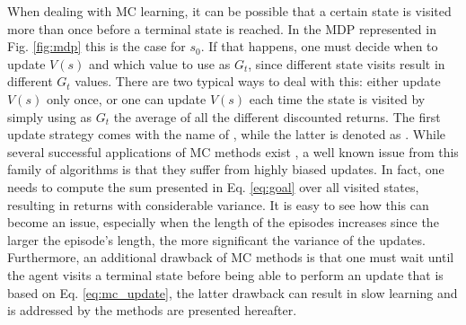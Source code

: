 When dealing with MC learning, it can be possible that a certain state is visited more than once before a terminal state is reached. In the MDP represented in Fig. \ref{fig:mdp} this is the case for $s_0$. If that happens, one must decide when to update $V(s)$ and which value to use as $G_t$, since different state visits result in different $G_t$ values. There are two typical ways to deal with this: either update $V(s)$ only once, or one can update $V(s)$ each time the state is visited by simply using as $G_t$ the average of all the different discounted returns. The first update strategy comes with the name of , while the latter is denoted as .
While several successful applications of MC methods exist \cite{jaakkola1995reinforcement,liu1998sequential,lazaric2007reinforcement}, a well known issue from this family of algorithms is that they suffer from highly biased updates. In fact, one needs to compute the sum presented in Eq. \ref{eq:goal} over all visited states, resulting in returns with considerable variance. It is easy to see how this can become an issue, especially when the length of the episodes increases since the larger the episode's length, the more significant the variance of the updates. Furthermore, an additional drawback of MC methods is that one must wait until the agent visits a terminal state before being able to perform an update that is based on Eq. \ref{eq:mc_update}, the latter drawback can result in slow learning and is addressed by the methods are presented hereafter.   

